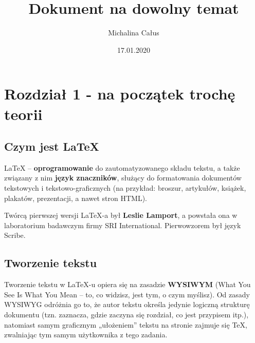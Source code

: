\documentclass{article}
\title{Dokument na dowolny temat}
\author{Michalina Całus}
\date{17.01.2020}
\begin{document}
\maketitle
\newpage

\newpage
\tableofcontents
\listoffigures
\listoftables

\newpage
\section{Rozdział 1 - na początek trochę teorii}
\subsection{Czym jest LaTeX}
LaTeX –  \textbf{oprogramowanie} do zautomatyzowanego składu tekstu\cite{pierwszy}, a także związany z nim \textbf{język znaczników}, służący do formatowania dokumentów tekstowych i tekstowo-graficznych (na przykład: broszur, artykułów, książek, plakatów, prezentacji, a nawet stron HTML). 

Twórcą pierwszej wersji LaTeX-a był \textbf{Leslie Lamport}, a powstała ona w laboratorium badawczym firmy SRI International. Pierwowzorem był język Scribe\cite{drugi}. 

\subsection{Tworzenie tekstu}
Tworzenie tekstu w LaTeX-u opiera się na zasadzie \textbf{WYSIWYM} (What You See Is What You Mean – to, co widzisz, jest tym, o czym myślisz). Od zasady WYSIWYG odróżnia go to, że autor tekstu określa jedynie logiczną strukturę dokumentu (tzn. zaznacza, gdzie zaczyna się rozdział, co jest przypisem itp.), natomiast samym graficznym „ułożeniem” tekstu na stronie zajmuje się TeX, zwalniając tym samym użytkownika z tego zadania. %
\end{document}
